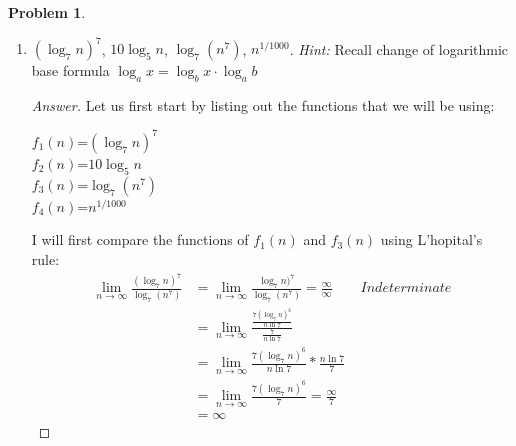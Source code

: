 \documentclass[11pt]{article}
\theoremstyle{definition}
\theoremstyle{definition}
\newtheorem{required}{Problem}
\theoremstyle{definition}
\begin{document}
\begin{required}
\begin{enumerate} [label=(\alph*)]
\begin{proof}[Answer]
We do not know whether $f_2(n)$ or $f_4(n)$ grows faster than each other so we will compare the two functions to each other using L'hopital's rule: \\
\begin{align*}
\lim_{n \to \infty} \frac{n+1000000}{\frac{n^2}{\sqrt{n}}} &= \lim_{n \to \infty} \frac{n+1000000}{n^{3/2}}  = \frac{\infty}{\infty} \qquad Indeterminate  \\
&= \lim_{n \to \infty} \frac{1}{\frac{3}{2}n^{\frac{1}{2}}}  = \frac{1}{\infty}\\
&= 0.
\end{align*} 
We can see from the above that $f_4(n)$ will grow faster than $f_2(n)$, such that $f_2(n) \leq O(f_4(n))$. This shows that $f_4(n)$ will be an upper bound of $f_2(n)$. Thus, $f_4(n) \geq \Omega(f_2(n))$, which is the lower bound. \\

Out of our set of functions we see that:
\begin{center}
The functions that grows the fastest: $f_3(n)$ \\
The function that grows the slowest: $f_2(n)$ 

\end{center}
\end{proof}

\newpage
\subsection{Problem 12\ref{1b}}
    \item \label{1b} $ (\log_7 n)^7 $, \qquad $10 \log_5 n$, \qquad $\log_7 (n^7)$, \qquad $n^{1/1000}$.
    \emph{Hint:} Recall change of logarithmic base formula $\log_a x = \log_b x\cdot\log_a b$
    \begin{proof}[Answer]
Let us first start by listing out the functions that we will be using:
\begin{center}
$f_1(n)$=$ (\log_7 n)^7 $ \\
$f_2(n)$=$10 \log_5 n$ \\
$f_3(n)$=$\log_7 (n^7)$ \\
$f_4(n)$=$n^{1/1000}$ \\
\end{center}

I will first compare the functions of $f_1(n)$ and $f_3(n)$ using L'hopital's rule:
\begin{align*}
\lim_{n \to \infty} \frac{(\log_7 n)^7}{\log_7 (n^{7})} &= \lim_{n \to \infty} \frac{\log_7 n)^7}{\log_7 (n^{7})}  = \frac{\infty}{\infty} \qquad Indeterminate  \\
&= \lim_{n \to \infty} \frac{\frac{7(\log_7 n)^6}{n\ln7}}{\frac{7}{n\ln7}}\\
&= \lim_{n \to \infty} \frac{7(\log_7 n)^6}{n\ln7} * \frac{n\ln7}{7} \\
&= \lim_{n \to \infty} \frac{7(\log_7 n)^6}{7} = \frac{\infty}{7}\\
&= \infty
\end{align*} 


\end{proof}
\end{enumerate}
\end{required}
\end{document}

